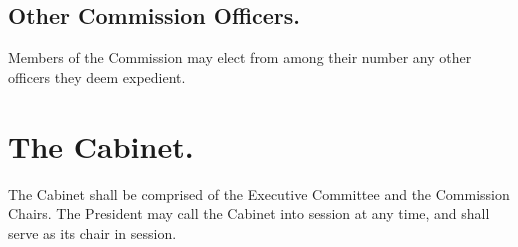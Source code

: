 \subsection{Other Commission Officers.}
Members of the Commission may elect from among their number any other officers they deem expedient.


\section{The Cabinet.}

The Cabinet shall be comprised of the Executive Committee and the Commission Chairs.  The President may call the Cabinet into session at any time, and shall serve as its chair in session.